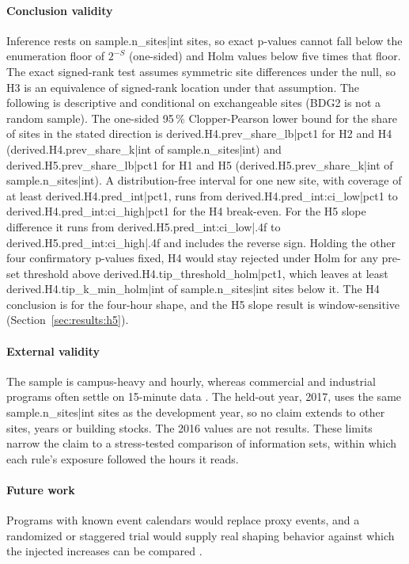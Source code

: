 \paragraph{Conclusion validity}Inference rests on {{sample.n_sites|int}} sites, so exact p-values cannot fall below the enumeration floor of $2^{-S}$ (one-sided) and Holm values below five times that floor. The exact signed-rank test assumes symmetric site differences under the null, so H3 is an equivalence of signed-rank location under that assumption. The following is descriptive and conditional on exchangeable sites (BDG2 is not a random sample). The one-sided 95\,\% Clopper-Pearson lower bound for the share of sites in the stated direction is {{derived.H4.prev_share_lb|pct1}} for H2 and H4 ({{derived.H4.prev_share_k|int}} of {{sample.n_sites|int}}) and {{derived.H5.prev_share_lb|pct1}} for H1 and H5 ({{derived.H5.prev_share_k|int}} of {{sample.n_sites|int}}). A distribution-free interval for one new site, with coverage of at least {{derived.H4.pred_int|pct1}}, runs from {{derived.H4.pred_int:ci_low|pct1}} to {{derived.H4.pred_int:ci_high|pct1}} for the H4 break-even. For the H5 slope difference it runs from {{derived.H5.pred_int:ci_low|.4f}} to {{derived.H5.pred_int:ci_high|.4f}} and includes the reverse sign. Holding the other four confirmatory p-values fixed, H4 would stay rejected under Holm for any pre-set threshold above {{derived.H4.tip_threshold_holm|pct1}}, which leaves at least {{derived.H4.tip_k_min_holm|int}} of {{sample.n_sites|int}} sites below it. The H4 conclusion is for the four-hour shape, and the H5 slope result is window-sensitive (Section~\ref{sec:results:h5}).

\paragraph{External validity}The sample is campus-heavy and hourly, whereas commercial and industrial programs often settle on 15-minute data \citep{mathieu2011,coughlin2009}. The held-out year, 2017, uses the same {{sample.n_sites|int}} sites as the development year, so no claim extends to other sites, years or building stocks. The 2016 values are not results. These limits narrow the claim to a stress-tested comparison of information sets, within which each rule's exposure followed the hours it reads.

\paragraph{Future work}Programs with known event calendars would replace proxy events, and a randomized or staggered trial would supply real shaping behavior against which the injected increases can be compared \citep{todd2019}.
